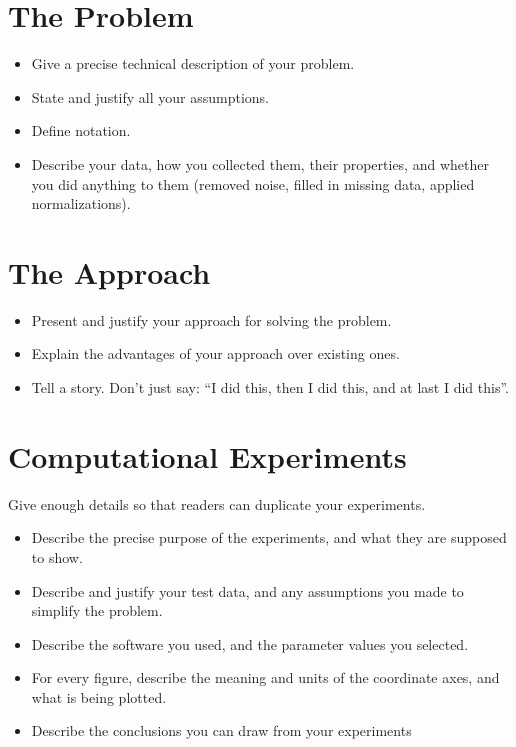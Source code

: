 \documentclass[10pt]{article}
\begin{document}
\section{The Problem}
\begin{itemize}
\item Give a precise technical description of your problem. 

\item State and justify all your assumptions. 

\item Define notation. 

\item Describe your data, how you collected them, their properties,
and whether you did 
anything to them (removed noise, filled in missing data, 
applied normalizations).
\end{itemize}


\section{The Approach}
\begin{itemize}
\item Present and justify your approach for solving the problem. 
\item Explain the advantages of your approach over existing ones.

\item Tell a story.
Don't just say: ``I did this, then I did this, and at last I did this''.
\end{itemize}

\section{Computational Experiments}
Give enough details so that readers can duplicate your experiments.

\begin{itemize}
\item Describe the precise purpose of the experiments, and what they 
are supposed to show.

\item Describe and justify your test data, and any assumptions you made to 
simplify the problem.

\item Describe the software you used, and the 
parameter values you selected.

\item 
For every figure, describe the meaning and units of the coordinate axes, 
and what is being plotted.

\item Describe the conclusions you can draw from your experiments
\end{itemize}
\end{document}
